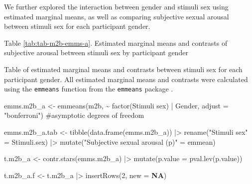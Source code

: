 \documentclass[
  bookmarksnumbered]{article}
\newenvironment{Shaded}{\begin{snugshade}}{\end{snugshade}}
\newcommand{\AttributeTok}[1]{\textcolor[rgb]{0.80,0.80,0.80}{#1}}
\newcommand{\CommentTok}[1]{\textcolor[rgb]{0.50,0.62,0.50}{#1}}
\newcommand{\ConstantTok}[1]{\textcolor[rgb]{0.86,0.64,0.64}{\textbf{#1}}}
\newcommand{\DecValTok}[1]{\textcolor[rgb]{0.86,0.86,0.80}{#1}}
\newcommand{\FunctionTok}[1]{\textcolor[rgb]{0.94,0.94,0.56}{#1}}
\newcommand{\NormalTok}[1]{\textcolor[rgb]{0.80,0.80,0.80}{#1}}
\newcommand{\OtherTok}[1]{\textcolor[rgb]{0.94,0.94,0.56}{#1}}
\newcommand{\SpecialCharTok}[1]{\textcolor[rgb]{0.86,0.64,0.64}{#1}}
\newcommand{\StringTok}[1]{\textcolor[rgb]{0.80,0.58,0.58}{#1}}
\begin{document}
We further explored the interaction between gender and stimuli sex using estimated marginal means, as well as comparing subjective sexual arousal between stimuli sex for each participant gender.

Table \ref{tab:tab-m2b-emms-a}. Estimated marginal means and contrasts of subjective arousal between stimuli sex by participant gender

Table of estimated marginal means and contrasts between stimuli sex for each participant gender. All estimated marginal means and contrasts were calculated using the \texttt{emmeans} function from the \texttt{emmeans} package \autocite{emmeanscit}.

\begin{Shaded}
\begin{Highlighting}[]
\NormalTok{emms.m2b\_a }\OtherTok{\textless{}{-}} \FunctionTok{emmeans}\NormalTok{(m2b, }\SpecialCharTok{\textasciitilde{}} \FunctionTok{factor}\NormalTok{(}\StringTok{\textasciigrave{}}\AttributeTok{Stimuli sex}\StringTok{\textasciigrave{}}\NormalTok{) }\SpecialCharTok{|}\NormalTok{ Gender,}
                    \AttributeTok{adjust =} \StringTok{"bonferroni"}\NormalTok{) }\CommentTok{\#asymptotic degrees of freedom}

\NormalTok{emms.m2b\_a.tab }\OtherTok{\textless{}{-}} \FunctionTok{tibble}\NormalTok{(}\FunctionTok{data.frame}\NormalTok{(emms.m2b\_a)) }\SpecialCharTok{|\textgreater{}}
  \FunctionTok{rename}\NormalTok{(}\StringTok{"Stimuli sex"} \OtherTok{=}\NormalTok{ Stimuli.sex) }\SpecialCharTok{|\textgreater{}} 
  \FunctionTok{mutate}\NormalTok{(}\StringTok{"Subjective sexual arousal (p)"} \OtherTok{=}\NormalTok{ emmean)}

\NormalTok{t.m2b\_a }\OtherTok{\textless{}{-}} \FunctionTok{contr.stars}\NormalTok{(emms.m2b\_a) }\SpecialCharTok{|\textgreater{}} 
  \FunctionTok{mutate}\NormalTok{(}\AttributeTok{p.value =} \FunctionTok{pval.lev}\NormalTok{(p.value))}

\NormalTok{t.m2b\_a.f }\OtherTok{\textless{}{-}}\NormalTok{ t.m2b\_a }\SpecialCharTok{|\textgreater{}} 
  \FunctionTok{insertRows}\NormalTok{(}\DecValTok{2}\NormalTok{, }\AttributeTok{new =} \ConstantTok{NA}\NormalTok{)}


\end{Highlighting}
\end{Shaded}
\end{document}
